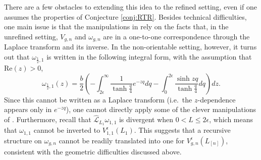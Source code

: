 \documentclass[12pt]{amsart}
\theoremstyle{plain}
\theoremstyle{definition}
\theoremstyle{remark}
\numberwithin{equation}{section}
\begin{document}
There are a few obstacles to extending this idea to the refined setting, even if one assumes the properties of Conjecture \ref{conj:RTR}. Besides technical difficulties, one main issue is that the manipulations in \cite{EO07-2} rely on the facts that, in the unrefined setting, $V_{g,n}$ and $\omega_{g,n}$ are in a one-to-one correspondence through the Laplace transform and its inverse. In the non-orientable setting, however, it turns out that $\omega_{\frac12,1}$ is written in the following integral form, with the assumption that $\text{Re}(z)>0$,
\[
     \omega_{\frac12,1}(z)=\frac{b}{2}\left(-\int_{2\epsilon}^\infty \frac{1}{\tanh\frac{q}{4}}e^{-zq}dq-\int_{0}^{2\epsilon}\frac{\sinh zq}{\tanh\frac{q}{4}}dq\right)dz.
\]
Since this cannot be written as a Laplace transform (i.e.~the $z$-dependence appears only in $e^{-zq}$), one cannot directly apply some of the clever manipulations of \cite{EO07-2}. Furthermore, recall that $\hat{\mathcal{L}}_{L_1}\omega_{1,1}$ is divergent when $0<L\leq2\epsilon$, which means that $\omega_{1,1}$ cannot be inverted to $V_{1,1}^{\epsilon}(L_1)$. This suggests that a recursive structure on $\omega_{g,n}$ cannot be readily translated into one for $V_{g,n}^{\epsilon}(L_{[n]})$, consistent with the geometric difficulties discussed above.

\end{document}
